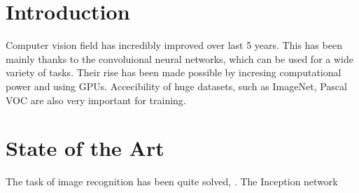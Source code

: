\documentclass[a4paper,12pt,titlepage, twoside]{article}
\begin{document}
\section{Introduction}

Computer vision field has incredibly improved over last 5 years. This has been mainly thanks to the convoluional neural networks, which can be used for a wide variety of tasks. Their rise has been made possible by incresing computational power and using GPUs. Accecibility of huge datasets, such as ImageNet\cite{imagenet}, Pascal VOC \cite{pascal} are also very important for training. 


\section{State of the Art}
The task of image recognition has been quite solved, . The Inception network \cite{inception}




{}
\cleardoublepage
\clearpage
\end{document}
